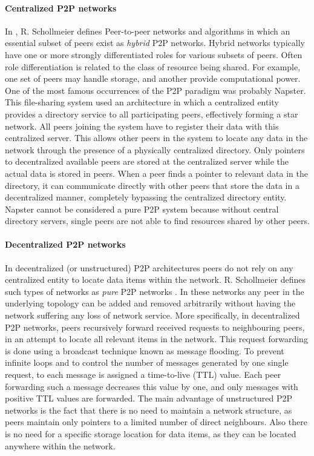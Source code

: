 \paragraph{Centralized P2P networks} 
In \cite{Schollmeier:2001:DPN:882470.883282}, R. Schollmeier defines Peer-to-peer networks and algorithms in which an essential subset of peers exist as \textit{hybrid} P2P networks. Hybrid networks typically have one or more strongly differentiated roles for various subsets of peers. Often role differentiation is related to the class of resource being shared. For example, one set of peers may handle storage, and another provide computational power. One of the most famous occurrences of the P2P paradigm was probably Napster\cite{Carlsson:2001:RFN:647728.734520}. This file-sharing system used an architecture in which a centralized entity provides a directory service to all participating peers, effectively forming a star network. All peers joining the system have to register their data with this centralized server. This allows other peers in the system to locate any data in the network through the presence of a physically centralized directory. Only pointers to decentralized available peers are stored at the centralized server while the actual data is stored in peers. When a peer finds a pointer to relevant data in the directory, it can communicate directly with other peers that store the data in a decentralized manner, completely bypassing the centralized directory entity. Napster cannot be considered a pure P2P system because without central directory servers, single peers are not able to find resources shared by other peers.
\\

\paragraph{Decentralized P2P networks}
In decentralized (or unstructured) P2P architectures peers do not rely on any centralized entity to locate data items within the network. R. Schollmeier defines such types of networks as \textit{pure} P2P networks \cite{Schollmeier:2001:DPN:882470.883282}. In these networks any peer in the underlying topology can be added and removed arbitrarily without having the network suffering any loss of network service. More specifically, in decentralized P2P networks, peers recursively forward received requests to neighbouring peers, in an attempt to locate all relevant items in the network. This request forwarding is done using a broadcast technique known as message flooding. To prevent infinite loops and to control the number of messages generated by one single request, to each message is assigned a time-to-live (TTL) value. Each peer forwarding such a message decreases this value by one, and only messages with positive TTL values are forwarded. The main advantage of unstructured P2P networks is the fact that there is no need to maintain a network structure, as peers maintain only pointers to a limited number of direct neighbours. Also there is no need for a specific storage location for data items, as they can be located anywhere within the network.
\\

